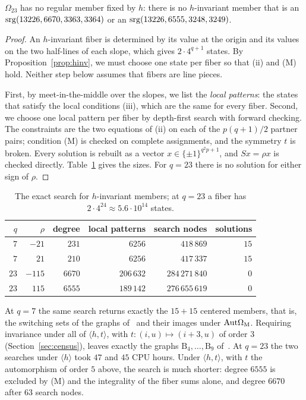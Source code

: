 \begin{proposition}\label{prop:q23h}
$\Omega_{23}$ has no regular member fixed by $h$: there is no $h$-invariant member that is an
$\mathrm{srg}(13226,6670,3363,3364)$ or an $\mathrm{srg}(13226,6555,3248,3249)$.
\end{proposition}
\begin{proof}
An $h$-invariant fiber is determined by its value at the origin and its values on the two half-lines of each slope,
which gives $2\cdot4^{q+1}$ states. By Proposition~\ref{prop:hinv}, we must choose one state per fiber so that (ii)
and (M) hold. Neither step below assumes that fibers are line pieces.

First, by meet-in-the-middle over the slopes, we list the \emph{local patterns}: the states that satisfy the local
conditions (iii), which are the same for every fiber. Second, we choose one local pattern per fiber by depth-first
search with forward checking. The constraints are the two equations of (ii) on each of the $p(q+1)/2$ partner pairs;
condition (M) is checked on complete assignments, and the symmetry $t$ is broken. Every solution is rebuilt as a vector
$x\in\{\pm1\}^{q^2p+1}$, and $Sx=\rho x$ is checked directly. Table~\ref{tab:search} gives the sizes. For $q=23$ there
is no solution for either sign of $\rho$.
\end{proof}

\begin{table}[h]
\centering\small
\begin{tabular}{rrrrrr}
\toprule
$q$ & $\rho$ & degree & local patterns & search nodes & solutions\\
\midrule
$7$ & $-21$ & $231$ & $6256$ & $418\,869$ & $15$\\
$7$ & $21$ & $210$ & $6256$ & $417\,337$ & $15$\\
$23$ & $-115$ & $6670$ & $206\,632$ & $284\,271\,840$ & $0$\\
$23$ & $115$ & $6555$ & $189\,142$ & $276\,655\,619$ & $0$\\
\bottomrule
\end{tabular}
\caption{The exact search for $h$-invariant members; at $q=23$ a fiber has $2\cdot4^{24}\approx5.6\cdot10^{14}$ states.}
\label{tab:search}
\end{table}

\begin{remark}[controls]\label{rem:search}
At $q=7$ the same search returns exactly the $15+15$ centered members, that is, the switching sets of the graphs
of~\cite{Plummer442} and their images under $\mathrm{Aut}\Omega_{\mathrm M}$. Requiring invariance under all of $\langle h,t\rangle$, with
$t\colon(i,u)\mapsto(i+3,u)$ of order $3$ (Section~\ref{sec:census}), leaves
exactly the graphs $\mathrm B_4,\dots,\mathrm B_9$ of~\cite[Table~1]{Plummer442}. At $q=23$ the two searches under
$\langle h\rangle$ took $47$ and $45$ CPU hours. Under $\langle h,t\rangle$, with $t$ the automorphism of order $5$ above, the search is much shorter: degree $6555$ is
excluded by (M) and the integrality of the fiber sums alone, and degree $6670$ after $63$ search nodes.
\end{remark}

